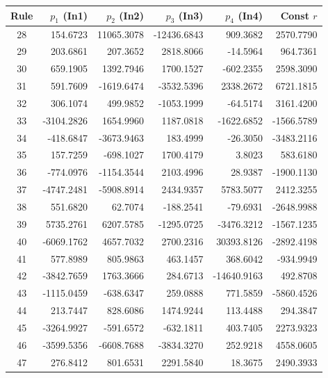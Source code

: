 \documentclass[12pt]{article}
\begin{document}
\begin{table}[H]
\centering
\small
\setlength{\tabcolsep}{4pt}
\begin{tabular}{|c|r|r|r|r|r|}
\hline
\textbf{Rule} & \textbf{$p_1$ (In1)} & \textbf{$p_2$ (In2)} & \textbf{$p_3$ (In3)} & \textbf{$p_4$ (In4)} & \textbf{Const $r$} \\ \hline
28 & 154.6723 & 11065.3078 & -12436.6843 & 909.3682 & 2570.7790 \\ \hline
29 & 203.6861 & 207.3652 & 2818.8066 & -14.5964 & 964.7361 \\ \hline
30 & 659.1905 & 1392.7946 & 1700.1527 & -602.2355 & 2598.3090 \\ \hline
31 & 591.7609 & -1619.6474 & -3532.5396 & 2338.2672 & 6721.1815 \\ \hline
32 & 306.1074 & 499.9852 & -1053.1999 & -64.5174 & 3161.4200 \\ \hline
33 & -3104.2826 & 1654.9960 & 1187.0818 & -1622.6852 & -1566.5789 \\ \hline
34 & -418.6847 & -3673.9463 & 183.4999 & -26.3050 & -3483.2116 \\ \hline
35 & 157.7259 & -698.1027 & 1700.4179 & 3.8023 & 583.6180 \\ \hline
36 & -774.0976 & -1154.3544 & 2103.4996 & 28.9387 & -1900.1130 \\ \hline
37 & -4747.2481 & -5908.8914 & 2434.9357 & 5783.5077 & 2412.3255 \\ \hline
38 & 551.6820 & 62.7074 & -188.2541 & -79.6931 & -2648.9988 \\ \hline
39 & 5735.2761 & 6207.5785 & -1295.0725 & -3476.3212 & -1567.1235 \\ \hline
40 & -6069.1762 & 4657.7032 & 2700.2316 & 30393.8126 & -2892.4198 \\ \hline
41 & 577.8989 & 805.9863 & 463.1457 & 368.6042 & -934.9949 \\ \hline
42 & -3842.7659 & 1763.3666 & 284.6713 & -14640.9163 & 492.8708 \\ \hline
43 & -1115.0459 & -638.6347 & 259.0888 & 771.5859 & -5860.4526 \\ \hline
44 & 213.7447 & 828.6086 & 1474.9244 & 113.4488 & 294.3847 \\ \hline
45 & -3264.9927 & -591.6572 & -632.1811 & 403.7405 & 2273.9323 \\ \hline
46 & -3599.5356 & -6608.7688 & -3834.3270 & 252.9218 & 4558.0605 \\ \hline
47 & 276.8412 & 801.6531 & 2291.5840 & 18.3675 & 2490.3933 \\ \hline

\end{tabular}
\end{table}
\end{document}
